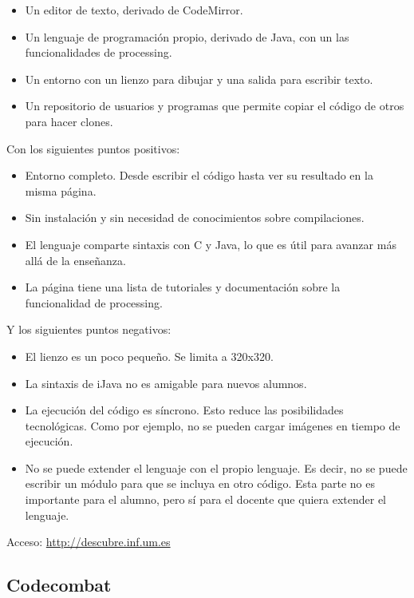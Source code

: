 \documentclass{report}
\begin{document}
\begin{itemize}
	\item Un editor de texto, derivado de CodeMirror.
	\item Un lenguaje de programación propio, derivado de Java, con un las funcionalidades de processing.
	\item Un entorno con un lienzo para dibujar y una salida para escribir texto.
	\item Un repositorio de usuarios y programas que permite copiar el código de otros para hacer clones. 
\end{itemize}

Con los siguientes puntos positivos:

\begin{itemize}
	\item Entorno completo. Desde escribir el código hasta ver su resultado en la misma página.
	\item Sin instalación y sin necesidad de conocimientos sobre compilaciones.
	\item El lenguaje comparte sintaxis con C y Java, lo que es útil para avanzar más allá de la enseñanza. 
	\item La página tiene una lista de tutoriales y documentación sobre la funcionalidad de processing.
\end{itemize}

Y los siguientes puntos negativos:

\begin{itemize}
	\item El lienzo es un poco pequeño. Se limita a 320x320.
	\item La sintaxis de iJava no es amigable para nuevos alumnos.
	\item La ejecución del código es síncrono. Esto reduce las posibilidades tecnológicas. Como por ejemplo, no se pueden cargar imágenes en tiempo de ejecución.
	\item No se puede extender el lenguaje con el propio lenguaje. Es decir, no se puede escribir un módulo para que se incluya en otro código. Esta parte no es importante para el alumno, pero sí para el docente que quiera extender el lenguaje.
\end{itemize}

Acceso: \url{http://descubre.inf.um.es}

\subsection{Codecombat}
\end{document}
